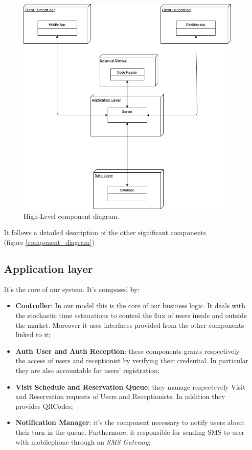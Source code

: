 \begin{figure}[H]
  \centering
  \includegraphics[scale=0.25]{diagrams/h_level.png}
  \caption{High-Level component diagram.}
    \label{fig:highlevel}

\end{figure}



It follows a detailed description of the other significant components \\
(figure \ref{component_diagram})

\pagebreak
\subsection{Application layer}
It's the core of our system. It's composed by:
\begin{itemize}
\item \textbf{Controller}: In our model this is the core of our business logic. It deals with the stochastic time estimations to control the flux of users inside and outside the market. Moreover it uses interfaces provided from the other components linked to it;
\item \textbf{Auth User and Auth Reception}: these components grants respectively the access of users and receptionist by verifying their credential. In particular they are also accountable for users' registration;
\item \textbf{Visit Schedule and Reservation Queue}: they manage respectevely Visit and Reservation requests of Users and Receptionists. In addition they provides QRCodes;
\item \textbf{Notification Manager}: it's the component necessary to notify users about their turn in the queue. Furthermore, it responsible for sending SMS to user with mobilephone through an \textit{SMS Gateway};
\end{itemize}


